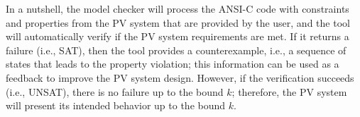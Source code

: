 \documentclass[review]{elsarticle}
\begin{document}
%
In a nutshell, the model checker will process the ANSI-C code with constraints %
and properties %
from the PV system that are provided by the user, and the tool will automatically verify if the PV system requirements are met. If it returns a failure (i.e., SAT), then the tool provides a counterexample, i.e., a sequence of states that leads to the property violation; this information can be used as a feedback to improve the PV system design. However, if the verification succeeds (i.e., UNSAT), there is no failure up to the bound $k$; therefore, the PV system will present its intended behavior up to the bound $k$.
%
%
%
% 
%
%
%
\end{document}
